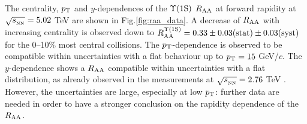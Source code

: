The centrality, $p_{\rm T}$ and $y$-dependences of the $\mbox{$\Upsilon$(1S)}$ $\mbox{$R_{\rm{AA}}$}$ at forward rapidity at $\sqrt{s_{_{\rm NN}}}=5.02$ \rm{TeV} are shown in Fig.\ref{fig:raa_data}. 
A decrease of $\mbox{$R_{\rm{AA}}$}$ with increasing centrality is observed down to $R_{\rm{AA}}^{\Upsilon(\rm1S)}=0.33\pm0.03\text{(stat)}\pm0.03\text{(syst)}$  for the 0--10\% most central collisions.
The $p_{\rm T}$-dependence is observed to be compatible within uncertainties with a flat behaviour up to $p_{\rm T}=15$ GeV/$c$.
The $y$-dependence shows a $\mbox{$R_{\rm{AA}}$}$ compatible within uncertainties with a flat distribution, as already observed in the measurements at $\sqrt{s_{_{\rm NN}}}=2.76$ \rm{TeV} \cite{Abelev:2014nua}.
However, the uncertainties are large, especially at low $p_{\rm{T}}$: further data are needed in order to have a stronger conclusion on the rapidity dependence of the $\mbox{$R_{\rm{AA}}$}$.

